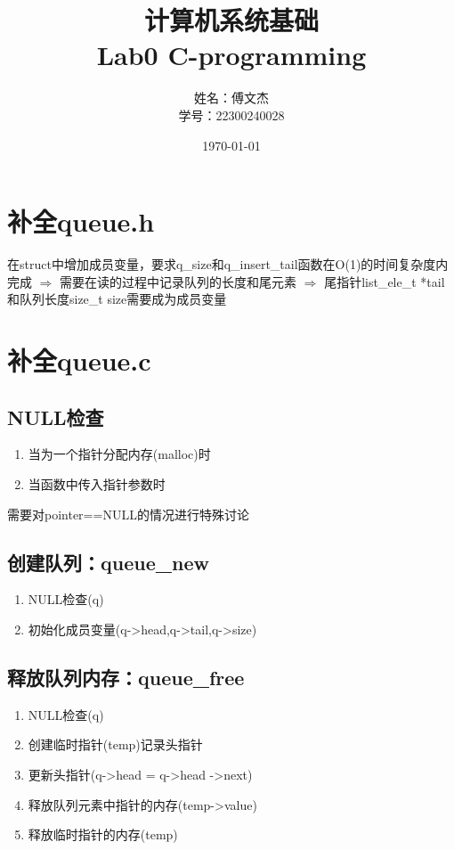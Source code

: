 \documentclass[12pt, a4paper, oneside]{ctexart}
\title{计算机系统基础\\
Lab0 C-programming} %
\author{姓名：傅文杰\\
学号：22300240028} %
\date{\today} %
\begin{document}
\maketitle %

\section{补全queue.h}
在struct中增加成员变量，要求q\_size和q\_insert\_tail函数在O(1)的时间复杂度内完成
$\Rightarrow$ 需要在读的过程中记录队列的长度和尾元素
$\Rightarrow$ 尾指针list\_ele\_t *tail和队列长度size\_t size需要成为成员变量

\section{补全queue.c}
\subsection{NULL检查}
\begin{enumerate}
    \item 当为一个指针分配内存(malloc)时
    \item 当函数中传入指针参数时
\end{enumerate}
需要对pointer==NULL的情况进行特殊讨论
\subsection{创建队列：queue\_new}
\begin{enumerate}
    \item NULL检查(q)
    \item 初始化成员变量(q-\textgreater head,q-\textgreater tail,q-\textgreater size)
\end{enumerate}
\subsection{释放队列内存：queue\_free}
\begin{enumerate}
    \item NULL检查(q)
    \item 创建临时指针(temp)记录头指针
    \item 更新头指针(q-\textgreater head = q-\textgreater head -\textgreater next)
    \item 释放队列元素中指针的内存(temp-\textgreater value)
    \item 释放临时指针的内存(temp)
\end{enumerate}
\end{document}
